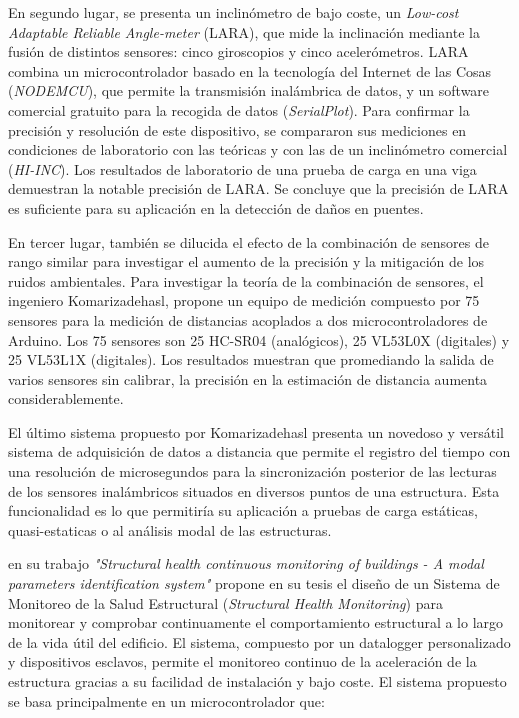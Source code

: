 \documentclass[12pt,letterpaper]{article}
\begin{document}
En segundo lugar, se presenta un inclinómetro de bajo coste, un \textit{Low-cost Adaptable Reliable Angle-meter} (LARA), que mide la inclinación mediante la fusión de distintos sensores: cinco giroscopios y cinco acelerómetros. LARA combina un microcontrolador basado en la tecnología del Internet de las Cosas (\textit{NODEMCU}), que permite la transmisión inalámbrica de datos, y un software comercial gratuito para la recogida de datos (\textit{SerialPlot}). Para confirmar la precisión y resolución de este dispositivo, se compararon sus mediciones en condiciones de laboratorio con las teóricas y con las de un inclinómetro comercial (\textit{HI-INC}). Los resultados de laboratorio de una prueba de carga en una viga demuestran la notable precisión de LARA. Se concluye que la precisión de LARA es suficiente para su aplicación en la detección de daños en puentes.

En tercer lugar, también se dilucida el efecto de la combinación de sensores de rango similar para investigar el aumento de la precisión y la mitigación de los ruidos ambientales. Para investigar la teoría de la combinación de sensores, el ingeniero Komarizadehasl, propone un equipo de medición compuesto por 75 sensores para la medición de distancias acoplados a dos microcontroladores de Arduino. Los 75 sensores son 25 HC-SR04 (analógicos), 25 VL53L0X (digitales) y 25 VL53L1X (digitales). Los resultados muestran que promediando la salida de varios sensores sin calibrar, la precisión en la estimación de distancia aumenta considerablemente.

El último sistema propuesto por Komarizadehasl presenta un novedoso y versátil sistema de adquisición de datos a distancia que permite el registro del tiempo con una resolución de microsegundos para la sincronización posterior de las lecturas de los sensores inalámbricos situados en diversos puntos de una estructura. Esta funcionalidad es lo que permitiría su aplicación a pruebas de carga estáticas, quasi-estaticas o al análisis modal de las estructuras.

\cite{muttillo2019structural} en su trabajo \textit{"Structural health continuous monitoring of buildings - A modal parameters identification system"} propone en su tesis el diseño de un Sistema de Monitoreo de la Salud Estructural (\textit{Structural Health Monitoring}) para monitorear y comprobar continuamente el comportamiento estructural a lo largo de la vida útil del edificio. El sistema, compuesto por un datalogger personalizado y dispositivos esclavos, permite el monitoreo continuo de la aceleración de la estructura gracias a su facilidad de instalación y bajo coste. El sistema propuesto se basa principalmente en un microcontrolador que: 
\end{document}
